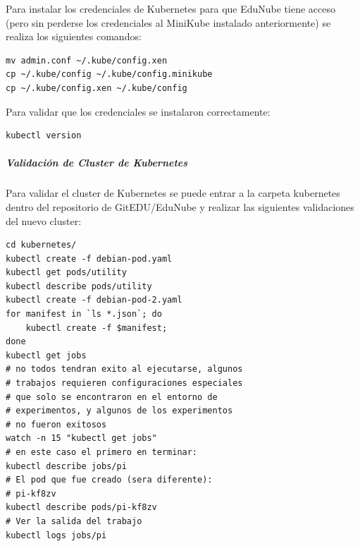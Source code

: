 Para instalar los credenciales de Kubernetes para que EduNube tiene acceso (pero sin perderse los credenciales al MiniKube instalado anteriormente) se realiza los siguientes comandos:
\begin{lstlisting}
mv admin.conf ~/.kube/config.xen
cp ~/.kube/config ~/.kube/config.minikube
cp ~/.kube/config.xen ~/.kube/config
\end{lstlisting}
\citep{kubernetes-create-cluster-kubeadm}

Para validar que los credenciales se instalaron correctamente:
\begin{lstlisting}
kubectl version
\end{lstlisting}
\citep{kubernetes-create-cluster-kubeadm}

\subparagraph{Validación de Cluster de Kubernetes}
Para validar el cluster de Kubernetes se puede entrar a la carpeta kubernetes dentro del repositorio de GitEDU/EduNube y realizar las siguientes validaciones del nuevo cluster:
\begin{lstlisting}
cd kubernetes/
kubectl create -f debian-pod.yaml
kubectl get pods/utility
kubectl describe pods/utility
kubectl create -f debian-pod-2.yaml
for manifest in `ls *.json`; do
    kubectl create -f $manifest;
done
kubectl get jobs
# no todos tendran exito al ejecutarse, algunos
# trabajos requieren configuraciones especiales
# que solo se encontraron en el entorno de
# experimentos, y algunos de los experimentos
# no fueron exitosos
watch -n 15 "kubectl get jobs"
# en este caso el primero en terminar:
kubectl describe jobs/pi
# El pod que fue creado (sera diferente):
# pi-kf8zv
kubectl describe pods/pi-kf8zv
# Ver la salida del trabajo
kubectl logs jobs/pi
\end{lstlisting}

